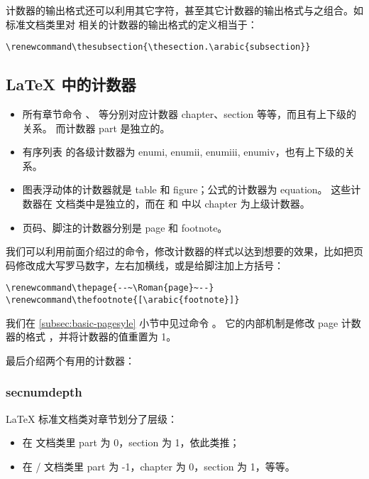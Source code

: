 计数器的输出格式还可以利用其它字符，甚至其它计数器的输出格式与之组合。如标准文档类里对  相关的计数器的输出格式的定义相当于：
\begin{verbatim}
\renewcommand\thesubsection{\thesection.\arabic{subsection}}
\end{verbatim}

\subsection{\LaTeX{} 中的计数器}\label{subsec:latex-counts}

\begin{itemize}
  \item 所有章节命令 、 等分别对应计数器 chapter、section 等等，而且有上下级的关系。
        而计数器 part 是独立的。
  \item 有序列表  的各级计数器为 enumi, enumii, enumiii, enumiv，也有上下级的关系。
  \item 图表浮动体的计数器就是 table 和 figure；公式的计数器为 equation。
        这些计数器在  文档类中是独立的，而在  和  中以 chapter 为上级计数器。
  \item 页码、脚注的计数器分别是 page 和 footnote。
\end{itemize}

我们可以利用前面介绍过的命令，修改计数器的样式以达到想要的效果，比如把页码修改成大写罗马数字，左右加横线，或是给脚注加上方括号：
\begin{verbatim}
\renewcommand\thepage{--~\Roman{page}~--}
\renewcommand\thefootnote{[\arabic{footnote}]}
\end{verbatim}

我们在 \ref{subsec:basic-pagesyle} 小节中见过命令 。
它的内部机制是修改 page 计数器的格式 ，并将计数器的值重置为 1。

最后介绍两个有用的计数器：

\subsubsection{secnumdepth}

\LaTeX{} 标准文档类对章节划分了层级：
\begin{itemize}
  \item 在  文档类里 part 为 0，section 为 1，依此类推；
  \item 在  /  文档类里 part 为 -1，chapter 为 0，section 为 1，等等。
\end{itemize}

